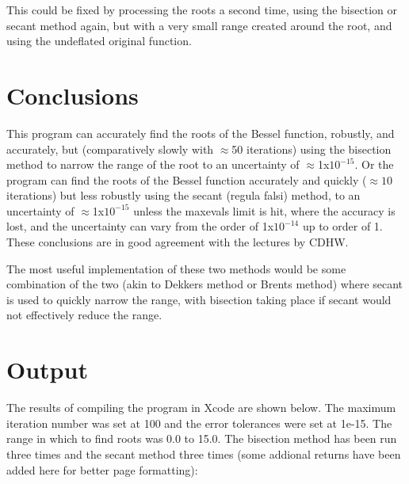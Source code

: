 \documentclass{article}
\begin{document}
This could be fixed by processing the roots a second time, using the bisection or secant method again, but with a very small range created around the root, and using the undeflated original function.




\section{Conclusions}

This program can accurately find the roots of the Bessel function, robustly, and accurately, but (comparatively slowly with $\approx$50 iterations) using the bisection method to narrow the range of the root to an uncertainty of $\approx$1x$10^{-15}$. Or the program can find the roots of the Bessel function accurately and quickly ($\approx10$ iterations) but less robustly using the secant (regula falsi) method, to an uncertainty of $\approx$1x$10^{-15}$ unless the maxevals limit is hit, where the accuracy is lost, and the uncertainty can vary from the order of 1x$10^{-14}$  up to order of 1. These conclusions are in good agreement with the lectures by CDHW.

The most useful implementation of these two methods would be some combination of the two (akin to Dekkers method or Brents method\cite{Brent}) where secant is used to quickly narrow the range, with bisection taking place if secant would not effectively reduce the range. 

\section{Output} 
The results of compiling the program in Xcode are shown below. The maximum iteration number was set at 100 and the error tolerances were set at 1e-15. The range in which to find roots was 0.0 to 15.0. The bisection method has been run three times and the secant method three times (some addional returns have been added here for better page formatting):
\end{document}
